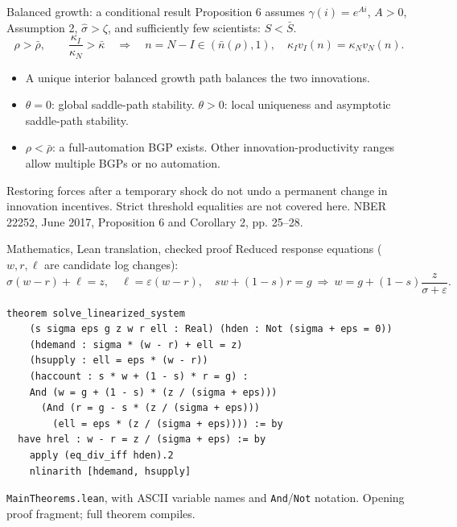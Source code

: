 \documentclass[aspectratio=169,11pt]{beamer}
\newcommand{\src}[1]{\vfill{\scriptsize\color{gray}NBER 22252, June 2017, #1.}}
\newcommand{\sh}{\widehat\sigma}
\begin{document}
\begin{frame}{Balanced growth: a conditional result}
Proposition 6 assumes $\gamma(i)=e^{Ai}$, $A>0$, Assumption 2, $\sh>\zeta$, and sufficiently few scientists: $S<\bar S$.
\[
\rho>\bar\rho,\qquad\frac{\kappa_I}{\kappa_N}>\bar\kappa
\quad\Longrightarrow\quad
n=N-I\in(\bar n(\rho),1),\quad\kappa_Iv_I(n)=\kappa_Nv_N(n).
\]
\begin{itemize}
\item A unique interior balanced growth path balances the two innovations.
\item $\theta=0$: global saddle-path stability. $\theta>0$: local uniqueness and asymptotic saddle-path stability.
\item $\rho<\bar\rho$: a full-automation BGP exists. Other innovation-productivity ranges allow multiple BGPs or no automation.
\end{itemize}
\small Restoring forces after a temporary shock do not undo a permanent change in innovation incentives. Strict threshold equalities are not covered here.
\src{Proposition 6 and Corollary 2, pp. 25--28}
\end{frame}

\begin{frame}[fragile]{Mathematics, Lean translation, checked proof}
\small Reduced response equations ($w,r,\ell$ are candidate log changes):
\[
\sigma(w-r)+\ell=z,\quad\ell=\varepsilon(w-r),\quad sw+(1-s)r=g
\ \Rightarrow\ w=g+(1-s)\frac z{\sigma+\varepsilon}.
\]
\begin{lstlisting}
theorem solve_linearized_system
    (s sigma eps g z w r ell : Real) (hden : Not (sigma + eps = 0))
    (hdemand : sigma * (w - r) + ell = z)
    (hsupply : ell = eps * (w - r))
    (haccount : s * w + (1 - s) * r = g) :
    And (w = g + (1 - s) * (z / (sigma + eps)))
      (And (r = g - s * (z / (sigma + eps)))
        (ell = eps * (z / (sigma + eps)))) := by
  have hrel : w - r = z / (sigma + eps) := by
    apply (eq_div_iff hden).2
    nlinarith [hdemand, hsupply]
\end{lstlisting}
\scriptsize \texttt{MainTheorems.lean}, with ASCII variable names and \texttt{And}/\texttt{Not} notation. Opening proof fragment; full theorem compiles.
\end{frame}
\end{document}
